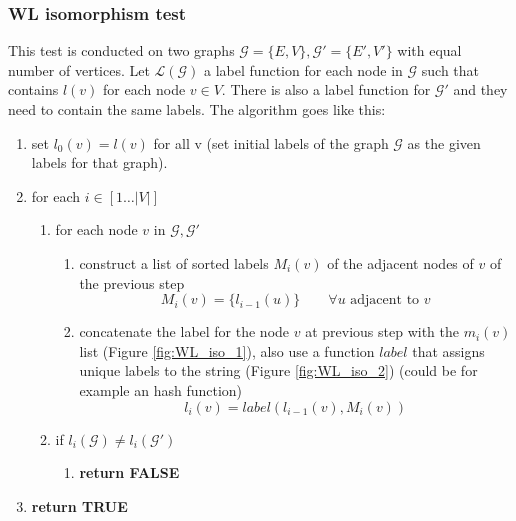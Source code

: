 \subsubsection{WL isomorphism test}
This test is conducted on two graphs $\mathcal{G}= \{E, V\}, \mathcal{G'}= \{E',
V'\}$ with equal number of vertices. Let $\mathcal{L}(\mathcal{G})$ a label
function for each node in $\mathcal{G}$ such that contains $l(v)$ for each node
$v \in V$. There is also a label function for $\mathcal{G}'$ and they need to contain
the same labels. The algorithm goes like this:
\begin{enumerate}
	\item set $l_{0}(v) = l(v)$ for all v (set initial labels of the graph
		$\mathcal{G}$ as the given labels for that graph).

	\item for each $i \in [ 1 \dots |V| ]$
		\begin{enumerate}
			\item for each node $v$ in $\mathcal{G}, \mathcal{G'}$
				\begin{enumerate}
					\item construct a list of sorted labels $M_{i}(v)$ of the adjacent nodes
						of $v$ of the previous step
						\[
							M_{i}(v) = \{ l_{i-1}(u) \} \qquad \forall u \text{ adjacent to }v
						\]

					\item concatenate the label for the node $v$ at previous step with the
						$m_{i}(v)$ list (Figure \ref{fig:WL_iso_1}), also use a function
						$label$ that assigns unique labels to the string (Figure \ref{fig:WL_iso_2})
						(could be for example an hash function)
						\[
							l_{i}(v) = label (l_{i-1}(v), M_{i}(v))
						\]
				\end{enumerate}

			\item if $l_{i}(\mathcal{G}) \neq l_{i}(\mathcal{G'})$
				\begin{enumerate}
					\item \textbf{return FALSE}
				\end{enumerate}
		\end{enumerate}

	\item \textbf{return TRUE}
\end{enumerate}


